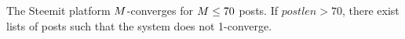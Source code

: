 \begin{corollary}
  The Steemit platform $M$-converges for $M \leq 70$ posts. If
  $postlen > 70$, there exist lists of posts such that the system does not
  1-converge.
\end{corollary}
